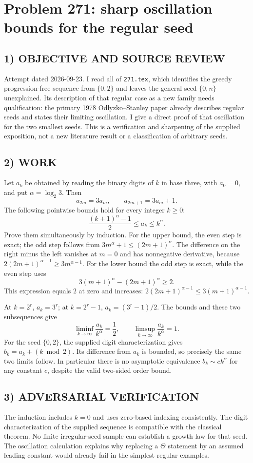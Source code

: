 \section{Problem 271: sharp oscillation bounds for the regular seed}
\subsection*{1) OBJECTIVE AND SOURCE REVIEW}
Attempt dated 2026-09-23. I read all of \texttt{271.tex}, which identifies the greedy progression-free sequence from $\{0,2\}$ and leaves the general seed $\{0,n\}$ unexplained. Its description of that regular case as a new family needs qualification: the primary 1978 Odlyzko--Stanley paper already describes regular seeds and states their limiting oscillation. I give a direct proof of that oscillation for the two smallest seeds. This is a verification and sharpening of the supplied exposition, not a new literature result or a classification of arbitrary seeds.
\subsection*{2) WORK}
Let $a_k$ be obtained by reading the binary digits of $k$ in base three, with $a_0=0$, and put $\alpha=\log_2 3$. Then
\[
a_{2m}=3a_m,\qquad a_{2m+1}=3a_m+1.
\]
The following pointwise bounds hold for every integer $k\ge0$:
\[
\frac{(k+1)^\alpha-1}{2}\le a_k\le k^\alpha.
\]
Prove them simultaneously by induction. For the upper bound, the even step is exact; the odd step follows from $3m^\alpha+1\le(2m+1)^\alpha$. The difference on the right minus the left vanishes at $m=0$ and has nonnegative derivative, because $2(2m+1)^{\alpha-1}\ge3m^{\alpha-1}$. For the lower bound the odd step is exact, while the even step uses
\[
3(m+1)^\alpha-(2m+1)^\alpha\ge2.
\]
This expression equals $2$ at zero and increases: $2(2m+1)^{\alpha-1}\le3(m+1)^{\alpha-1}$.

At $k=2^r$, $a_k=3^r$; at $k=2^r-1$, $a_k=(3^r-1)/2$. The bounds and these two subsequences give
\[
\liminf_{k\to\infty}\frac{a_k}{k^\alpha}=\frac12,
\qquad
\limsup_{k\to\infty}\frac{a_k}{k^\alpha}=1.
\]
For the seed $\{0,2\}$, the supplied digit characterization gives $b_k=a_k+(k\bmod2)$. Its difference from $a_k$ is bounded, so precisely the same two limits follow. In particular there is no asymptotic equivalence $b_k\sim c k^\alpha$ for any constant $c$, despite the valid two-sided order bound.
\subsection*{3) ADVERSARIAL VERIFICATION}
The induction includes $k=0$ and uses zero-based indexing consistently. The digit characterization of the supplied sequence is compatible with the classical theorem. No finite irregular-seed sample can establish a growth law for that seed. The oscillation calculation explains why replacing a $\Theta$ statement by an assumed leading constant would already fail in the simplest regular examples.
